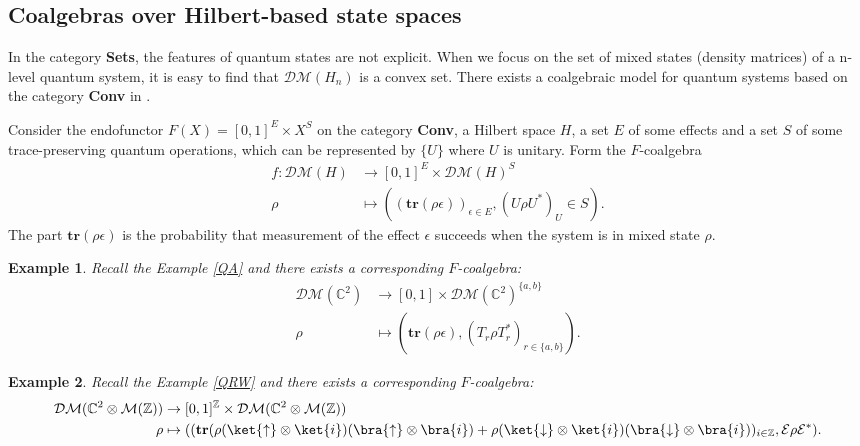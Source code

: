 \documentclass[a4paper, 11pt]{article}
\newtheorem{example}{Example}
\begin{document}
\subsection{Coalgebras over Hilbert-based state spaces}
In the category \textbf{Sets}, the features of quantum states are not explicit. When we focus on the set of mixed states (density matrices) of a n-level quantum system, it is easy to find that $\mathcal{DM}(H_n)$ is a convex set. There exists a coalgebraic model for quantum systems based on the category \textbf{Conv} in \cite{F14}.

Consider the endofunctor $F(X)=[0,1]^E\times X^S$ on the category \textbf{Conv}, a Hilbert space $H$, a set $E$ of some effects and a set $S$ of some trace-preserving quantum operations, which can be represented by $\{U\}$ where $U$ is unitary. Form the $F$-coalgebra
$$
\begin{aligned}
f:\mathcal{DM}(H)&\rightarrow[0,1]^E\times \mathcal{DM}(H)^S\\
\rho&\mapsto((\mathbf{tr}(\rho\epsilon))_{\epsilon\in E},(U\rho U^*)_U\in S). 
\end{aligned}
$$
The part $\mathbf{tr}(\rho\epsilon)$ is the probability that measurement of the effect $\epsilon$ succeeds when the system is in mixed state $\rho$. 

\begin{example}
\label{CQA}
Recall the Example \ref{QA} and there exists a corresponding $F$-coalgebra:
$$
\begin{aligned}
\mathcal{DM}(\mathbb{C}^2)&\rightarrow [0,1]\times \mathcal{DM}(\mathbb{C}^2)^{\{a,b\}}\\
\rho&\mapsto(\mathbf{tr}(\rho\epsilon),(T_r\rho T_r^*)_{r\in \{a,b\}}).
\end{aligned}
$$ 
\end{example}

\begin{example}
Recall the Example \ref{QRW} and there exists a corresponding $F$-coalgebra:
$$
\begin{aligned}
\mathcal{DM}(\mathbb{C}^2\otimes\mathcal{M}(\mathbb{Z}))&\rightarrow [0,1]^\mathbb{Z}\times\mathcal{DM}(\mathbb{C}^2\otimes\mathcal{M}(\mathbb{Z}))\\
\rho&\mapsto((\mathbf{tr}(\rho(\ket{\uparrow}\otimes\ket{i})(\bra{\uparrow}\otimes\bra{i})+\rho(\ket{\downarrow}\otimes\ket{i})(\bra{\downarrow}\otimes\bra{i}))_{i\in\mathbb{Z}},\mathcal{E}\rho\mathcal{E}^*).
\end{aligned}
$$
\end{example}
\end{document}
